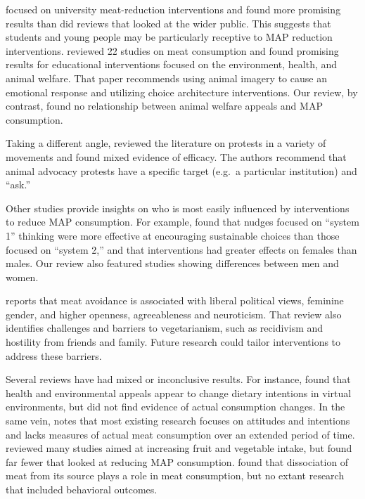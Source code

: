 \documentclass[sn-nature,referee,pdflatex]{sn-jnl}
\begin{document}
\citep{chang2023} focused on university meat-reduction interventions and
found more promising results than did reviews that looked at the wider
public. This suggests that students and young people may be particularly
receptive to MAP reduction interventions. \citep{harguess2020} reviewed
22 studies on meat consumption and found promising results for
educational interventions focused on the environment, health, and animal
welfare. That paper recommends using animal imagery to cause an
emotional response and utilizing choice architecture interventions. Our
review, by contrast, found no relationship between animal welfare
appeals and MAP consumption.

Taking a different angle, \citep{adleberg2018} reviewed the literature
on protests in a variety of movements and found mixed evidence of
efficacy. The authors recommend that animal advocacy protests have a
specific target (e.g.~a particular institution) and ``ask.''

Other studies provide insights on who is most easily influenced by
interventions to reduce MAP consumption. For example,
\citep{blackford2021} found that nudges focused on ``system 1'' thinking
were more effective at encouraging sustainable choices than those
focused on ``system 2,'' and that interventions had greater effects on
females than males. Our review also featured studies showing differences
between men and women.

\citep{rosenfeld2018} reports that meat avoidance is associated with
liberal political views, feminine gender, and higher openness,
agreeableness and neuroticism. That review also identifies challenges
and barriers to vegetarianism, such as recidivism and hostility from
friends and family. Future research could tailor interventions to
address these barriers.

Several reviews have had mixed or inconclusive results. For instance,
\citep{bianchi2018conscious} found that health and environmental appeals
appear to change dietary intentions in virtual environments, but did not
find evidence of actual consumption changes. In the same vein,
\citep{kwasny2022} notes that most existing research focuses on
attitudes and intentions and lacks measures of actual meat consumption
over an extended period of time. \citep{taufik2019} reviewed many
studies aimed at increasing fruit and vegetable intake, but found far
fewer that looked at reducing MAP consumption. \citep{benningstad2020}
found that dissociation of meat from its source plays a role in meat
consumption, but no extant research that included behavioral outcomes.
\end{document}
